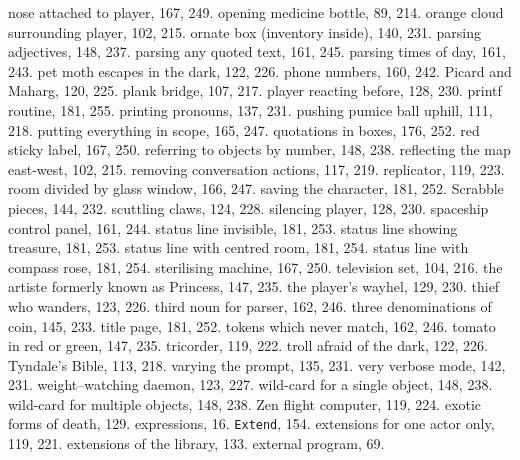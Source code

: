 \quad  nose attached to player, 167, 249.
\quad  opening medicine bottle, 89, 214.
\quad  orange cloud surrounding player, 102, 215.
\quad  ornate box (inventory inside), 140, 231.
\quad  parsing adjectives, 148, 237.
\quad  parsing any quoted text, 161, 245.
\quad  parsing times of day, 161, 243.
\quad  pet moth escapes in the dark, 122, 226.
\quad  phone numbers, 160, 242.
\quad  Picard and Maharg, 120, 225.
\quad  plank bridge, 107, 217.
\quad  player reacting before, 128, 230.
\quad  printf routine, 181, 255.
\quad  printing pronouns, 137, 231.
\quad  pushing pumice ball uphill, 111, 218.
\quad  putting everything in scope, 165, 247.
\quad  quotations in boxes, 176, 252.
\quad  red sticky label, 167, 250.
\quad  referring to objects by number, 148, 238.
\quad  reflecting the map east-west, 102, 215.
\quad  removing conversation actions, 117, 219.
\quad  replicator, 119, 223.
\quad  room divided by glass window, 166, 247.
\quad  saving the character, 181, 252.
\quad  Scrabble pieces, 144, 232.
\quad  scuttling claws, 124, 228.
\quad  silencing player, 128, 230.
\quad  spaceship control panel, 161, 244.
\quad  status line invisible, 181, 253.
\quad  status line showing treasure, 181, 253.
\quad  status line with centred room, 181, 254.
\quad  status line with compass rose, 181, 254.
\quad  sterilising machine, 167, 250.
\quad  television set, 104, 216.
\quad  the artiste formerly known as Princess, 147, 235.
\quad  the player's wayhel, 129, 230.
\quad  thief who wanders, 123, 226.
\quad  third noun for parser, 162, 246.
\quad  three denominations of coin, 145, 233.
\quad  title page, 181, 252.
\quad  tokens which never match, 162, 246.
\quad  tomato in red or green, 147, 235.
\quad  tricorder, 119, 222.
\quad  troll afraid of the dark, 122, 226.
\quad  Tyndale's Bible, 113, 218.
\quad  varying the prompt, 135, 231.
\quad  very verbose mode, 142, 231.
\quad  weight--watching daemon, 123, 227.
\quad  wild-card for a single object, 148, 238.
\quad  wild-card for multiple objects, 148, 238.
\quad  Zen flight computer, 119, 224.
exotic forms of death, 129.
expressions, 16.
{{\tt Extend}}, 154.
extensions for one actor only, 119, 221.
extensions of the library, 133.
external program, 69.

